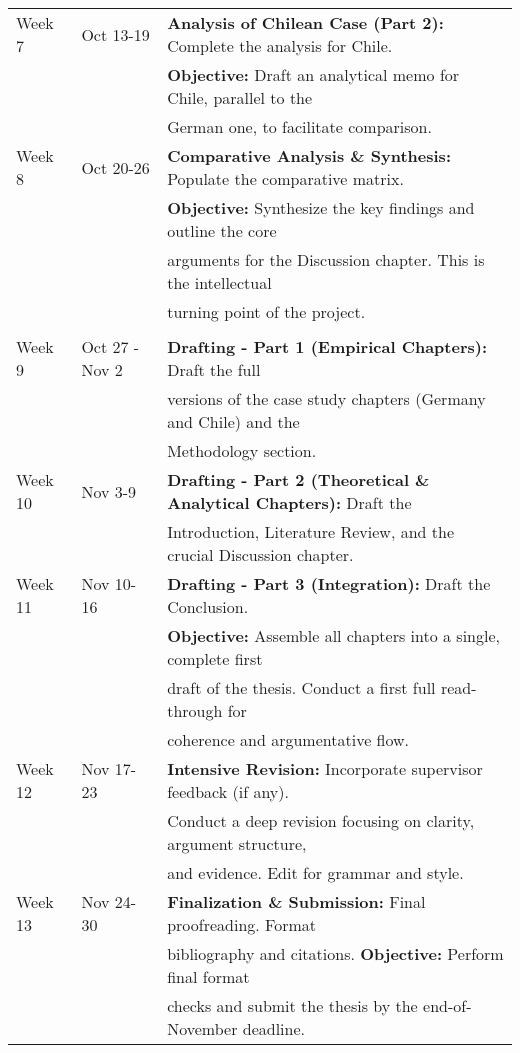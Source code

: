 \begin{longtable}{@{}lll@{}}
Week 7 & Oct 13-19 & \textbf{Analysis of Chilean Case (Part 2):} Complete the analysis for Chile. \\
& & \textbf{Objective:} Draft an analytical memo for Chile, parallel to the \\
& & German one, to facilitate comparison. \\ \addlinespace

Week 8 & Oct 20-26 & \textbf{Comparative Analysis \& Synthesis:} Populate the comparative matrix. \\
& & \textbf{Objective:} Synthesize the key findings and outline the core \\
& & arguments for the Discussion chapter. This is the intellectual \\
& & turning point of the project. \\ \addlinespace

\multicolumn{3}{l}{\textbf{Phase III: Synthesis and Writing (November)}} \\ \addlinespace
Week 9 & Oct 27 - Nov 2 & \textbf{Drafting - Part 1 (Empirical Chapters):} Draft the full \\
& & versions of the case study chapters (Germany and Chile) and the \\
& & Methodology section. \\ \addlinespace

Week 10 & Nov 3-9 & \textbf{Drafting - Part 2 (Theoretical \& Analytical Chapters):} Draft the \\
& & Introduction, Literature Review, and the crucial Discussion chapter. \\ \addlinespace

Week 11 & Nov 10-16 & \textbf{Drafting - Part 3 (Integration):} Draft the Conclusion. \\
& & \textbf{Objective:} Assemble all chapters into a single, complete first \\
& & draft of the thesis. Conduct a first full read-through for \\
& & coherence and argumentative flow. \\ \addlinespace

Week 12 & Nov 17-23 & \textbf{Intensive Revision:} Incorporate supervisor feedback (if any). \\
& & Conduct a deep revision focusing on clarity, argument structure, \\
& & and evidence. Edit for grammar and style. \\ \addlinespace

Week 13 & Nov 24-30 & \textbf{Finalization \& Submission:} Final proofreading. Format \\
& & bibliography and citations. \textbf{Objective:} Perform final format \\
& & checks and submit the thesis by the end-of-November deadline. \\

\end{longtable}